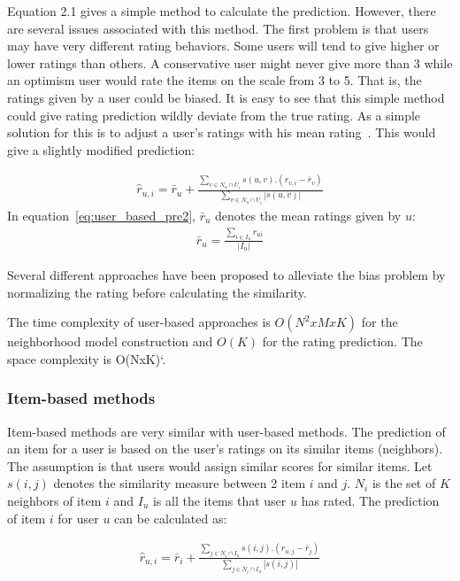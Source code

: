 \documentclass[oneside,13pt]{extreport}
\begin{document}
Equation 2.1 gives a simple method to calculate the prediction. However, there are several issues associated with this method. The first problem is that users may have very different rating behaviors. Some users will tend to give higher or lower ratings than others. A conservative user might never give more than 3 while an optimism user would rate the items on the scale from 3 to 5. That is, the ratings given by a user could be biased. It is easy to see that this simple method could give rating prediction wildly deviate from the true rating. As a simple solution for this is to adjust a user’s ratings with his mean rating~\cite{Resnick94}. This would give a slightly modified prediction:

\begin{eqnarray}
\label{eq:user_based_pre2}
\hat r_{u,i} = \bar r_u+\frac{{\sum\limits_{v \in {N_u} \cap {U_i}} {{s\left( {u,v} \right)}.({r_{v,i}}-\bar r_v)} }}{{\sum\limits_{v \in {N_u} \cap {U_i}} {\left| {s\left( {u,v} \right)} \right|}}}
\end{eqnarray}
In equation~\ref{eq:user_based_pre2}, $\bar r_u$ denotes the mean ratings given by $u$:
\begin{eqnarray}
\label{eq:mean_rating}
\bar r_u = \frac{{\sum\nolimits_{i \in {I_u}} {{r_{ui}}} }}{{\left| {{I_u}} \right|}}
\end{eqnarray}

Several different approaches have been proposed to alleviate the bias problem by normalizing the rating before calculating the similarity.

The time complexity of user-based approaches is $O(N^2xMxK)$ for the neighborhood model construction and $O(K)$ for the rating prediction. The  space complexity is O(NxK)`\cite{Chevalier}.

\subsubsection{Item-based methods}
Item-based methods are very similar with user-based methods. The prediction of an item for a user is based on the user’s ratings on its similar items (neighbors). The assumption is that users would assign similar
scores for similar items. Let $s\left( {i,j} \right)$ denotes the similarity measure between 2 item $i$ and $j$. $N_i$ is the set of $K$ neighbors of item $i$ and $I_u$ is all the items that user $u$ has rated. The prediction of item $i$ for user $u$ can be calculated as:

\begin{eqnarray}
\label{eq:item_based_pre}
\hat r_{u,i} = \bar r_i+\frac{{\sum\limits_{j \in {N_i} \cap {I_u}} {{s\left( {i,j} \right)}.({r_{u,j}}-\bar r_j)} }}{{\sum\limits_{j \in {N_i} \cap {I_u}}  {\left| {s\left( {i,j} \right)} \right|} }}
\end{eqnarray}
\end{document}
